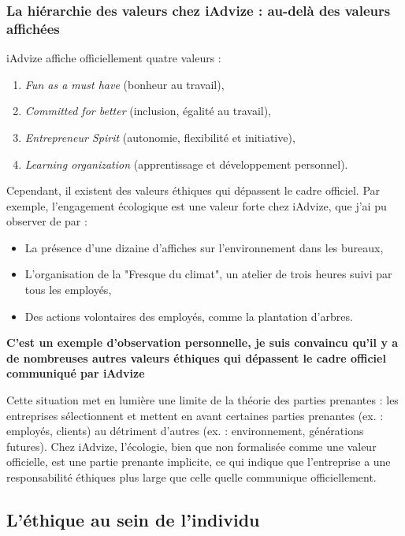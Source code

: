 \documentclass[12pt,a4paper]{report}
\begin{document}
\subsubsection{La hiérarchie des valeurs chez iAdvize : au-delà des valeurs affichées}
iAdvize affiche officiellement quatre valeurs :
\begin{enumerate}
    \item \textit{Fun as a must have} (bonheur au travail),\\
    \item \textit{Committed for better} (inclusion, égalité au travail),\\
    \item \textit{Entrepreneur Spirit} (autonomie, flexibilité et initiative),\\
    \item \textit{Learning organization} (apprentissage et développement personnel).\\
\end{enumerate}

Cependant, il existent des valeurs éthiques qui dépassent le cadre officiel. Par exemple, l'engagement écologique est une valeur forte chez iAdvize, que j'ai pu observer de par :
\begin{itemize}
    \item La présence d'une dizaine d'affiches sur l'environnement dans les bureaux,
    \item L'organisation de la "Fresque du climat", un atelier de trois heures suivi par tous les employés,
    \item Des actions volontaires des employés, comme la plantation d'arbres.
\end{itemize}

\textbf{C'est un exemple d'observation personnelle, je suis convaincu qu'il y a de nombreuses autres valeurs éthiques qui dépassent le cadre officiel communiqué par iAdvize}

Cette situation met en lumière une limite de la théorie des parties prenantes : les entreprises sélectionnent et mettent en avant certaines parties prenantes (ex. : employés, clients) au détriment d'autres (ex. : environnement, générations futures). Chez iAdvize, l'écologie, bien que non formalisée comme une valeur officielle, est une partie prenante implicite, ce qui indique que l'entreprise a une responsabilité éthiques plus large que celle quelle communique officiellement.

\subsection{L'éthique au sein de l'individu}
\end{document}
